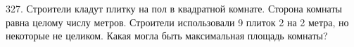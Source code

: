 327. Строители кладут плитку на пол в квадратной комнате. Сторона комнаты равна целому числу метров. Строители использовали 9 плиток 2 на 2 метра,
но некоторые не целиком. Какая могла быть максимальная площадь комнаты?\\
